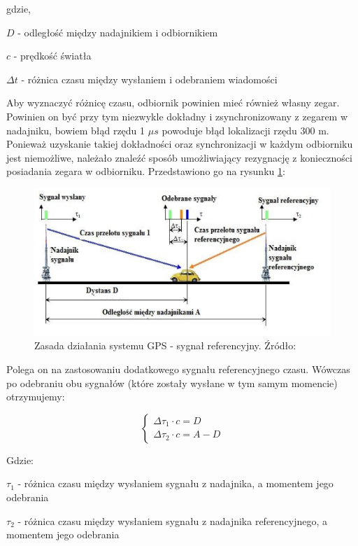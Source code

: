 gdzie,

$D$ - odległość między nadajnikiem i odbiornikiem

$c$ - prędkość światła

$\Delta t$ - różnica czasu między wysłaniem i odebraniem wiadomości

Aby wyznaczyć różnicę czasu, odbiornik powinien mieć również własny zegar. Powinien on być przy tym niezwykle dokładny i zsynchronizowany z zegarem w nadajniku, bowiem błąd rzędu 1 $\mu s$ powoduje błąd lokalizacji rzędu 300 m. Ponieważ uzyskanie takiej dokładności oraz synchronizacji w każdym odbiorniku jest niemożliwe, należało znaleźć sposób umożliwiający rezygnację z konieczności posiadania zegara w odbiorniku. Przedstawiono go na rysunku \ref{fig:image_gps_basics2}:

\begin{figure}[H]
	\centering
	\includegraphics[width=12cm]{img/theory/GPS/gps_basics2.png}
	\caption{Zasada działania systemu GPS - sygnał referencyjny. Źródło: \cite{inzynierka}}
	\label{fig:image_gps_basics2}
\end{figure}

Polega on na zastosowaniu dodatkowego sygnału referencyjnego czasu. Wówczas po odebraniu obu sygnałów (które zostały wysłane w tym samym momencie) otrzymujemy:

\begin{equation}
\begin{cases}
\Delta \tau_1 \cdot c = D \\ 
\Delta \tau_2 \cdot c = A - D
\end{cases}
\end{equation}

Gdzie:

$\tau_1$ - różnica czasu między wysłaniem sygnału z nadajnika, a momentem jego odebrania

$\tau_2$ - różnica czasu między wysłaniem sygnału z nadajnika referencyjnego, a momentem jego odebrania

